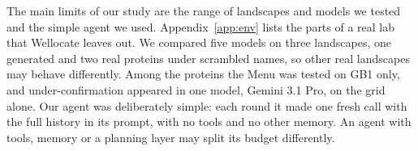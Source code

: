 The main limits of our study are the range of landscapes and models we tested and the simple agent we used. Appendix~\ref{app:env} lists the parts of a real lab that Wellocate leaves out. We compared five models on three landscapes, one
generated and two real proteins under scrambled names, so other real landscapes may behave differently. Among the
proteins the Menu was tested on GB1 only, and under-confirmation appeared in one model, Gemini 3.1 Pro, on the grid
alone. Our agent was deliberately simple: each round it made one fresh call with the full history in its prompt, with no
tools and no other memory. An agent with tools, memory or a planning layer may split its budget differently.
